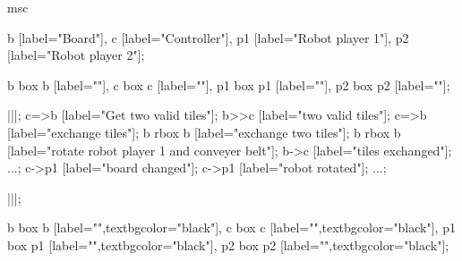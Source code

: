 \begin{msc}
msc
{

b [label="Board"],
c [label="Controller"],
p1 [label="Robot player 1"],
p2 [label="Robot player 2"];

b box b [label=""],
c box c [label=""],
p1 box p1 [label=""],
p2 box p2 [label=""];

|||;
c=>b [label="Get two valid tiles"];
b>>c [label="two valid tiles"];
c=>b [label="exchange tiles"];
b rbox b [label="exchange two tiles"];
b rbox b [label="rotate robot player 1 and conveyer belt"];
b->c [label="tiles exchanged"];
...;
c->p1 [label="board changed"];
c->p1 [label="robot rotated"];
...;

|||;

b box b [label="",textbgcolor="black"],
c box c [label="",textbgcolor="black"],
p1 box p1 [label="",textbgcolor="black"],
p2 box p2 [label="",textbgcolor="black"];

}
\end{msc}
